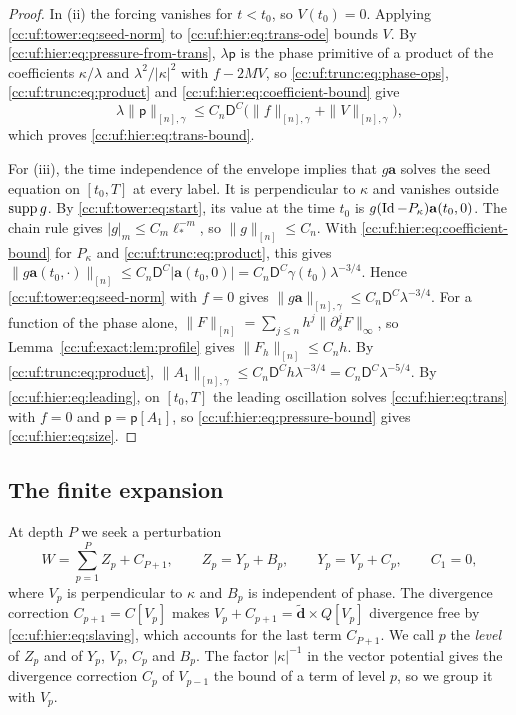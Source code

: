 \begin{proof}
In (ii) the forcing vanishes for $t<t_0$, so $V(t_0)=0$.
Applying \eqref{cc:uf:tower:eq:seed-norm} to
\eqref{cc:uf:hier:eq:trans-ode} bounds $V$. By
\eqref{cc:uf:hier:eq:pressure-from-trans}, $\lambda\mathsf p$ is the
phase primitive of a product of the coefficients $\kappa/\lambda$ and
$\lambda^2/|\kappa|^2$ with $f-2MV$, so
\eqref{cc:uf:trunc:eq:phase-ops}, \eqref{cc:uf:trunc:eq:product} and
\eqref{cc:uf:hier:eq:coefficient-bound} give
\begin{equation}\label{cc:uf:hier:eq:pressure-bound}
 \lambda\|\mathsf p\|_{[n],\gamma}
 \le C_n\mathsf D^C\bigl(\|f\|_{[n],\gamma}+\|V\|_{[n],\gamma}\bigr),
\end{equation}
which proves \eqref{cc:uf:hier:eq:trans-bound}.

For (iii), the time independence of the envelope implies that $g\mathbf a$
solves the seed equation on $[t_0,T]$ at every label. It is perpendicular
to $\kappa$ and vanishes outside $\operatorname{supp} g$. By
\eqref{cc:uf:tower:eq:start}, its value at
the time $t_0$ is $g(\operatorname{Id}-P_\kappa)\mathbf a(t_0,0)$. The chain rule
gives $|g|_m\le C_m\ell_*^{-m}$, so $\|g\|_{[n]}\le C_n$. With
\eqref{cc:uf:hier:eq:coefficient-bound} for
$P_\kappa$ and \eqref{cc:uf:trunc:eq:product}, this gives
$\|g\mathbf a(t_0,\cdot)\|_{[n]}
\le C_n\mathsf D^C|\mathbf a(t_0,0)|=C_n\mathsf D^C\gamma(t_0)\lambda^{-3/4}$.
Hence \eqref{cc:uf:tower:eq:seed-norm} with $f=0$ gives
$\|g\mathbf a\|_{[n],\gamma}\le C_n\mathsf D^C\lambda^{-3/4}$.
For a function of the phase alone,
$\|F\|_{[n]}=\sum_{j\le n}h^j\|\partial_s^jF\|_\infty$, so
Lemma~\ref{cc:uf:exact:lem:profile} gives $\|F_h\|_{[n]}\le C_nh$.
By \eqref{cc:uf:trunc:eq:product},
$\|A_1\|_{[n],\gamma}\le C_n\mathsf D^C h\lambda^{-3/4}
=C_n\mathsf D^C\lambda^{-5/4}$. By \eqref{cc:uf:hier:eq:leading}, on
$[t_0,T]$ the leading oscillation solves \eqref{cc:uf:hier:eq:trans}
with $f=0$ and $\mathsf p=\mathsf p[A_1]$, so
\eqref{cc:uf:hier:eq:pressure-bound} gives \eqref{cc:uf:hier:eq:size}.
\end{proof}

\subsection{The finite expansion}\label{cc:uf:sec:hierarchy}
At depth $P$ we seek a perturbation
\[
 W=\sum_{p=1}^P Z_p+C_{P+1},\qquad
 Z_p=Y_p+B_p,\qquad Y_p=V_p+C_p,\qquad C_1=0,
\]
where $V_p$ is perpendicular to $\kappa$ and $B_p$ is independent of phase.
The divergence correction $C_{p+1}=C[V_p]$ makes
$V_p+C_{p+1}=\widetilde{\mathbf d}\times Q[V_p]$ divergence free by
\eqref{cc:uf:hier:eq:slaving}, which accounts for the last term $C_{P+1}$.
We call $p$ the \emph{level} of $Z_p$ and of $Y_p$, $V_p$, $C_p$ and
$B_p$. The factor $|\kappa|^{-1}$ in the vector potential gives the
divergence correction $C_p$ of $V_{p-1}$ the bound of a term of
level $p$, so we group it with $V_p$.

